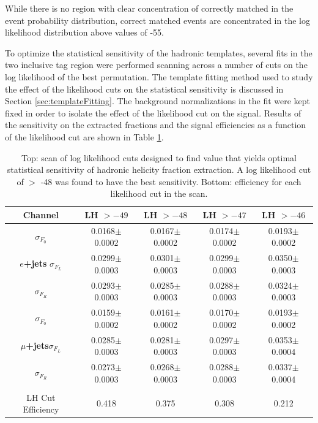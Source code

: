 While there is no region with clear concentration of correctly matched \ttbar in the event probability distribution, correct matched events are concentrated in the log likelihood distribution above values of -55.

To optimize the statistical sensitivity of the hadronic templates, several fits in the two inclusive \bt tag region were performed scanning across a number of cuts on the log likelihood of the best permutation. The template fitting method used to study the effect of the likelihood cuts on the statistical sensitivity is discussed in Section \ref{sec:templateFitting}. The background normalizations in the fit were kept fixed in order to isolate the effect of the likelihood cut on the \ttbar signal. Results of the sensitivity on the extracted fractions and the signal efficiencies as a function of the likelihood cut are shown in Table \ref{tab:hadOpt_table}.

\begin{table}[h!]
\centering
    \begin{tabular}{c | c | c | c | c}
        Channel & LH $>-49$ & LH $>-48$ & LH $>-47$ & LH $>-46$\\
        \hline
         \hfill$\sigma_{F_0}$                    &  0.0168$\pm$0.0002  &  0.0167$\pm$0.0002  &  0.0174$\pm$0.0002  &  0.0193$\pm$0.0002 \\
        \textbf{$e$+jets} \hfill$\sigma_{F_L}$   &  0.0299$\pm$0.0003  &  0.0301$\pm$0.0003  &  0.0299$\pm$0.0003  &  0.0350$\pm$0.0003 \\
         \hfill$\sigma_{F_R}$                    &  0.0293$\pm$0.0003  &  0.0285$\pm$0.0003  &  0.0288$\pm$0.0003  &  0.0324$\pm$0.0003 \\
        \hline
         \hfill$\sigma_{F_0}$                    &  0.0159$\pm$0.0002  &  0.0161$\pm$0.0002  &  0.0170$\pm$0.0002  &  0.0193$\pm$0.0002 \\
        \textbf{$\mu$+jets}\hfill$\sigma_{F_L}$  &  0.0285$\pm$0.0003  &  0.0281$\pm$0.0003  &  0.0297$\pm$0.0003  &  0.0353$\pm$0.0004 \\
         \hfill$\sigma_{F_R}$                    &  0.0273$\pm$0.0003  &  0.0268$\pm$0.0003  &  0.0288$\pm$0.0003  &  0.0337$\pm$0.0004 \\\hline
         \multicolumn{5}{c}{ }\\
         \hline
         LH Cut Efficiency &  0.418 &  0.375  &  0.308  &  0.212 \\
        \hline
      \end{tabular}
      \caption{Top: scan of log likelihood cuts designed to find value that yields optimal statistical sensitivity of hadronic helicity fraction extraction. A log likelihood cut of $>$ -48 was found to have the best sensitivity. Bottom: \ttbar efficiency for each likelihood cut in the scan.}
    \label{tab:hadOpt_table}
    \end{table}


